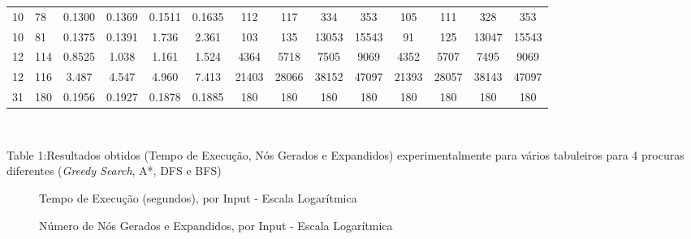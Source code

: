 \documentclass[12pt,a4paper]{article}
\begin{document}
\begin{adjustbox}{width={\textwidth}, totalheight={\textheight}, keepaspectratio}
\begin{tabular}{ll cccc cccc cccc}
    10                        & 78                                        & 0.1300                          & 0.1369                             & 0.1511 & 0.1635 & 112   & 117   & 334   & 353   & 105   & 111   & 328   & 353   \\
    10                        & 81                                        & 0.1375                          & 0.1391                             & 1.736  & 2.361  & 103   & 135   & 13053 & 15543 & 91    & 125   & 13047 & 15543 \\
    12                        & 114                                       & 0.8525                          & 1.038                              & 1.161  & 1.524  & 4364  & 5718  & 7505  & 9069  & 4352  & 5707  & 7495  & 9069  \\
    12                        & 116                                       & 3.487                           & 4.547                              & 4.960  & 7.413  & 21403 & 28066 & 38152 & 47097 & 21393 & 28057 & 38143 & 47097 \\
    31                        & 180                                       & 0.1956                          & 0.1927                             & 0.1878 & 0.1885 & 180   & 180   & 180   & 180   & 180   & 180   & 180   & 180   \\
    \bottomrule
  \end{tabular}
\end{adjustbox} \\

\vspace{-0.5cm}

\begin{center}
  Table 1:\quad Resultados obtidos (Tempo de Execução, Nós Gerados e Expandidos) experimentalmente para vários tabuleiros
  para 4 procuras diferentes (\textit{Greedy Search}, A*, DFS e BFS)
\end{center}

\begin{figure}[h]%
  \centering
  
  \caption{Tempo de Execução (segundos), por Input - Escala Logarítmica}
\end{figure}

\begin{figure}[h]%
  \centering
  \qquad
  \caption{Número de Nós Gerados e Expandidos, por Input - Escala Logarítmica}%
\end{figure}
\end{document}
